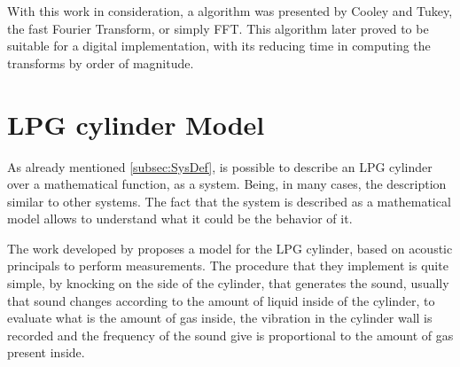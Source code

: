 With this work in consideration, a algorithm was presented by Cooley and Tukey, the fast Fourier Transform, or simply FFT. This algorithm later proved to be suitable for a digital implementation, with its reducing time in computing the transforms by order of magnitude\cite{oppenheimSignalsSystems1997}.



\section{LPG cylinder Model}\label{sec:LPGModel}
As already mentioned \ref{subsec:SysDef}, is possible to describe an LPG cylinder over a mathematical function, as a system. Being, in many cases, the description similar to other systems. The fact that the system is described as a mathematical model allows to understand what it could be the behavior of it. 

The work developed by \citeauthor{wuLiquidLevelDetector2014b} proposes a model for the LPG cylinder, based on acoustic principals to perform measurements. The procedure that they implement is quite simple, by knocking on the side of the cylinder, that generates the sound, usually that sound changes according to the amount of liquid inside of the cylinder, to evaluate what is the amount of gas inside, the vibration in the cylinder wall is recorded and the frequency of the sound give is proportional to the amount of gas present inside.

